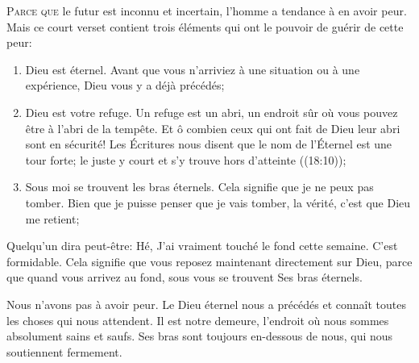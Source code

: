 \dvrule







\lettrine{P}{arce que} le futur est inconnu et incertain,
 l'homme a tendance à en avoir peur. Mais ce court verset
 contient trois éléments qui ont le pouvoir de guérir de cette peur:

\begin{enumerate}
  \item Dieu est éternel. Avant que vous n'arriviez à une situation
   ou à une expérience, Dieu vous y a déjà précédés;
  \item Dieu est votre refuge. Un refuge est un abri,
   un endroit sûr où vous pouvez être à l'abri de la tempête.
   Et ô combien ceux qui ont fait de Dieu leur abri sont en sécurité!
   Les Écritures nous disent que le nom de l'Éternel est une tour forte;
   le juste y court et s'y trouve hors d'atteinte ((18:10));
  \item Sous moi se trouvent les bras éternels.
   Cela signifie que je ne peux pas tomber.
   Bien que je puisse penser que je vais tomber,
   la vérité, c'est que Dieu me retient;
\end{enumerate}


Quelqu'un dira peut-être:
 \Og Hé, J'ai vraiment touché le fond cette semaine. \Fg{}
 C'est formidable. Cela signifie que vous reposez maintenant
 directement sur Dieu, parce que quand vous arrivez au fond,
 sous vous se trouvent Ses bras éternels.

Nous n'avons pas à avoir peur.
 Le Dieu éternel nous a précédés et connaît toutes les choses
 qui nous attendent. Il est notre demeure,
 l'endroit où nous sommes absolument sains et saufs.
 Ses bras sont toujours en-dessous de nous, qui nous soutiennent fermement. 


